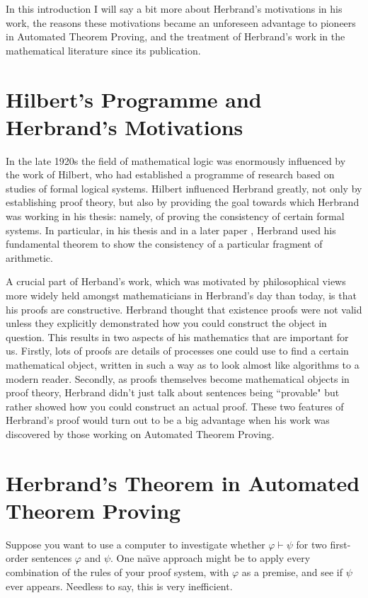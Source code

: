 \documentclass[a4paper,12pt]{report}
\theoremstyle{definition}
\begin{document}
In this introduction I will say a bit more about Herbrand's motivations in his work, the reasons these motivations became an unforeseen advantage to pioneers in Automated Theorem Proving, and the treatment of Herbrand's work in the mathematical literature since its publication.

\section{Hilbert's Programme and Herbrand's Motivations}

In the late 1920s the field of mathematical logic was enormously influenced by the work of Hilbert, who had established a programme of research based on studies of formal logical systems. Hilbert influenced Herbrand greatly, not only by establishing proof theory, but also by providing the goal towards which Herbrand was working in his thesis: namely, of proving the consistency of certain formal systems. In particular, in his thesis and in a later paper \cite{jh consistency}, Herbrand used his fundamental theorem to show the consistency of a particular fragment of arithmetic.

A crucial part of Herband's work, which was motivated by philosophical views more widely held amongst mathematicians in Herbrand's day than today, is that his proofs are constructive. Herbrand thought that existence proofs were not valid unless they explicitly demonstrated how you could construct the object in question. This results in two aspects of his mathematics that are important for us. Firstly, lots of proofs are details of processes one could use to find a certain mathematical object, written in such a way as to look almost like algorithms to a modern reader. Secondly, as proofs themselves become mathematical objects in proof theory, Herbrand didn't just talk about sentences being ``provable" but rather showed how you could construct an actual proof. These two features of Herbrand's proof would turn out to be a big advantage when his work was discovered by those working on Automated Theorem Proving.

\section{Herbrand's Theorem in Automated Theorem Proving}
\label{sec:atp}

Suppose you want to use a computer to investigate whether $\varphi \vdash \psi$ for two first-order sentences $\varphi$ and $\psi$. One na\"{\i}ve approach might be to apply every combination of the rules of your proof system, with $\varphi$ as a premise, and see if $\psi$ ever appears. Needless to say, this is very inefficient.
\end{document}
